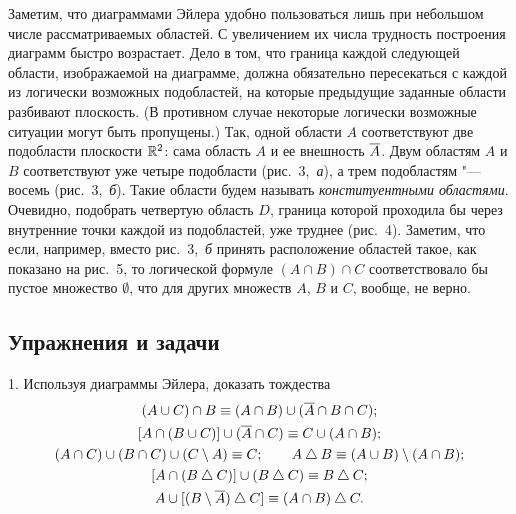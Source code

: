Заметим, что диаграммами Эйлера удобно пользоваться лишь при небольшом
числе рассматриваемых областей. С увеличением их числа трудность построения
диаграмм быстро возрастает. Дело в том, что граница каждой следующей
области, изображаемой на диаграмме, должна обязательно пересекаться
с каждой из логически возможных подобластей, на которые предыдущие заданные
области разбивают плоскость. (В противном случае некоторые логически
возможные ситуации могут быть пропущены.) Так, одной области $A$
соответствуют две подобласти плоскости $\mathbb R^2$: сама область $A$ и ее
внешность $\overline{A}$. Двум областям $A$ и $B$ соответствуют уже четыре
подобласти (рис.~3,~\emph{а}), а трем подобластям "--- восемь
(рис.~3,~\emph{б}). Такие области будем называть \emph{конституентными
областями}. Очевидно, подобрать четвертую область $D$, граница которой
проходила бы через внутренние точки каждой из подобластей, уже труднее
(рис.~4). Заметим, что если, например, вместо рис.~3,~\emph{б} принять
расположение областей такое, как показано на рис.~5, то логической формуле
$(A\cap B)\cap C$ соответствовало бы пустое множество $\emptyset$, что для
других множеств $A$, $B$ и $C$, вообще, не верно.

\begin{figure}[h]
\centering
{}
\end{figure}

\subsection*{Упражнения и задачи}
1. Используя диаграммы Эйлера, доказать тождества
\[
\begin{gathered}
(A\cup C)\cap B\equiv(A\cap B)\cup(\ov A\cap B\cap C);\\
[A\cap(B\cup C)]\cup(\ov A\cap C)\equiv C\cup(A\cap B);\\
(A\cap C)\cup(B\cap C)\cup(C\setminus A)\equiv C;\qquad A\sd B\equiv(A\cup B)\setminus(A\cap B);\\
[A\cap(B\sd C)]\cup(B\sd C)\equiv B\sd C;\\
A\cup[(B\setminus\ov A)\sd C]\equiv(A\cap B)\sd C.
\end{gathered}
\]



